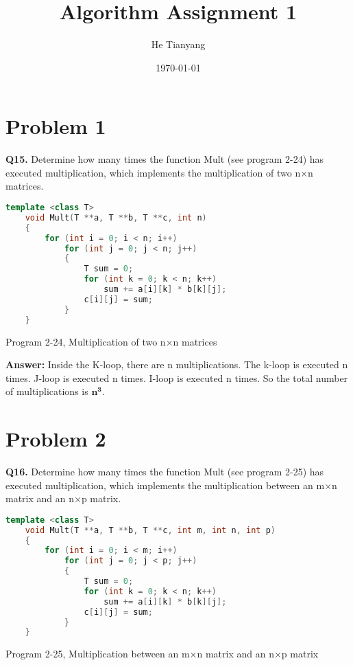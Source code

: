 \documentclass{article}
\title{Algorithm Assignment 1}
\author{He Tianyang}
\date{\today}
\begin{document}
\maketitle

\section{Problem 1}
\textbf{Q15.}  Determine how many times the function Mult (see program 2-24) has executed multiplication, which implements the multiplication of two n×n matrices.
\\


\begin{lstlisting}[language=C++]
    template <class T>
    void Mult(T **a, T **b, T **c, int n)
    {
        for (int i = 0; i < n; i++)
            for (int j = 0; j < n; j++)
            {
                T sum = 0;
                for (int k = 0; k < n; k++)
                    sum += a[i][k] * b[k][j];
                c[i][j] = sum;
            }
    }
\end{lstlisting}
\begin{center}
    Program 2-24, Multiplication of two n×n matrices
\end{center}

\textbf{Answer:} Inside the K-loop, there are n multiplications. The k-loop is executed n times. J-loop is executed n times. I-loop is executed n times. So the total number of multiplications is $\mathbf{n^3}$.

\section{Problem 2}

\textbf{Q16.}
Determine how many times the function Mult (see program 2-25) has executed multiplication, which implements the multiplication between an m×n matrix and an n×p matrix.

\begin{lstlisting}[language=C++]
    template <class T>
    void Mult(T **a, T **b, T **c, int m, int n, int p)
    {
        for (int i = 0; i < m; i++)
            for (int j = 0; j < p; j++)
            {
                T sum = 0;
                for (int k = 0; k < n; k++)
                    sum += a[i][k] * b[k][j];
                c[i][j] = sum;
            }
    }
\end{lstlisting}
\begin{center}
    Program 2-25, Multiplication between an m×n matrix and an n×p matrix
\end{center}
\end{document}
